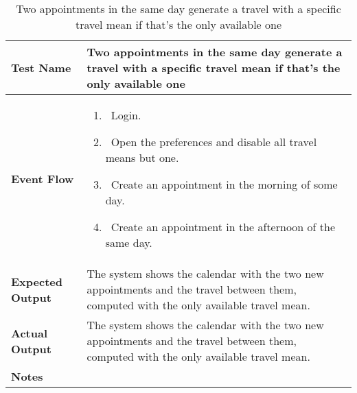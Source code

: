 \begin{table}[h]	
\centering
\def\arraystretch{1.5}
\begin{tabular}{|m{7cm}|m{7cm}|}
	\hline
	\textbf{Test Name}            &  Two appointments in the same day generate a travel with a specific travel mean if that's the only available one  \\ \hline
	\textbf{Event Flow}             &   
		\begin{enumerate}
			\item~Login.
			\item~Open the preferences and disable all travel means but one.
			\item~Create an appointment in the morning of some day.
			\item~Create an appointment in the afternoon of the same day.
		\end{enumerate}
	\\ \hline
	\textbf{Expected Output}  &   The system shows the calendar with the two new appointments and the travel between them, computed with the only available travel mean.  \\ \hline
	\textbf{Actual Output}       &  The system shows the calendar with the two new appointments and the travel between them, computed with the only available travel mean.   \\ \hline
	\textbf{Notes} & \\ \hline
\end{tabular}
\caption{Two appointments in the same day generate a travel with a specific travel mean if that's the only available one}
\end{table}